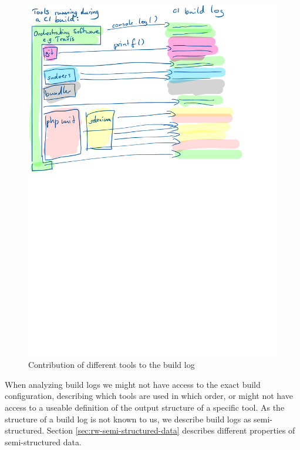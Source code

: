 \documentclass[\myrootdir/main.tex]{subfiles}
\begin{document}
\begin{figure}[htbp]
	\centering
	\includegraphics[width=\textwidth, trim={0cm 15cm 0cm 0cm}, clip]{img/tool-log-contribution.pdf}
	\caption{Contribution of different tools to the build log}
	\label{fig:tool-log-contribution}
\end{figure}

When analyzing build logs we might not have access to the exact build configuration, describing which tools are used in which order, or might not have access to a useable definition of the output structure of a specific tool.
As the structure of a build log is not known to us, we describe build logs as semi-structured. Section \ref{sec:rw-semi-structured-data} describes different properties of semi-structured data.
\end{document}
